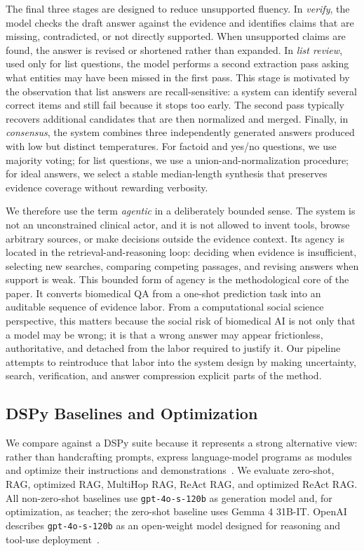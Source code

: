 \documentclass[sigconf,nonacm]{acmart}
\begin{document}
The final three stages are designed to reduce unsupported fluency. In \emph{verify}, the model checks the draft answer against the evidence and identifies claims that are missing, contradicted, or not directly supported. When unsupported claims are found, the answer is revised or shortened rather than expanded. In \emph{list review}, used only for list questions, the model performs a second extraction pass asking what entities may have been missed in the first pass. This stage is motivated by the observation that list answers are recall-sensitive: a system can identify several correct items and still fail because it stops too early. The second pass typically recovers additional candidates that are then normalized and merged. Finally, in \emph{consensus}, the system combines three independently generated answers produced with low but distinct temperatures. For factoid and yes/no questions, we use majority voting; for list questions, we use a union-and-normalization procedure; for ideal answers, we select a stable median-length synthesis that preserves evidence coverage without rewarding verbosity.

We therefore use the term \emph{agentic} in a deliberately bounded sense. The system is not an unconstrained clinical actor, and it is not allowed to invent tools, browse arbitrary sources, or make decisions outside the evidence context. Its agency is located in the retrieval-and-reasoning loop: deciding when evidence is insufficient, selecting new searches, comparing competing passages, and revising answers when support is weak. This bounded form of agency is the methodological core of the paper. It converts biomedical QA from a one-shot prediction task into an auditable sequence of evidence labor. From a computational social science perspective, this matters because the social risk of biomedical AI is not only that a model may be wrong; it is that a wrong answer may appear frictionless, authoritative, and detached from the labor required to justify it. Our pipeline attempts to reintroduce that labor into the system design by making uncertainty, search, verification, and answer compression explicit parts of the method.

\subsection{DSPy Baselines and Optimization}

We compare against a DSPy suite because it represents a strong alternative view: rather than handcrafting prompts, express language-model programs as modules and optimize their instructions and demonstrations~\cite{dspy}. We evaluate zero-shot, RAG, optimized RAG, MultiHop RAG, ReAct RAG, and optimized ReAct RAG. All non-zero-shot baselines use \texttt{gpt-4o-s-120b} as generation model and, for optimization, as teacher; the zero-shot baseline uses Gemma 4 31B-IT. OpenAI describes \texttt{gpt-4o-s-120b} as an open-weight model designed for reasoning and tool-use deployment~\cite{openai_gpt4os}.
\end{document}

